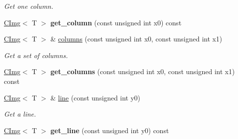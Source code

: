 \begin{DoxyCompactItemize}
\begin{DoxyCompactList}\small\item\em Get one column. \item\end{DoxyCompactList}\item 
\hypertarget{structcimg__library_1_1CImg_ad077e00ce00fcebb299518496bf5bdb5}{
\hyperlink{structcimg__library_1_1CImg}{CImg}$<$ T $>$ {\bfseries get\_\-column} (const unsigned int x0) const }
\label{structcimg__library_1_1CImg_ad077e00ce00fcebb299518496bf5bdb5}

\item 
\hypertarget{structcimg__library_1_1CImg_aa70ff39a9a7bd64954f4f18819f8e596}{
\hyperlink{structcimg__library_1_1CImg}{CImg}$<$ T $>$ \& \hyperlink{structcimg__library_1_1CImg_aa70ff39a9a7bd64954f4f18819f8e596}{columns} (const unsigned int x0, const unsigned int x1)}
\label{structcimg__library_1_1CImg_aa70ff39a9a7bd64954f4f18819f8e596}

\begin{DoxyCompactList}\small\item\em Get a set of columns. \item\end{DoxyCompactList}\item 
\hypertarget{structcimg__library_1_1CImg_a1bc03749880ec2542c303c5c81eea0a2}{
\hyperlink{structcimg__library_1_1CImg}{CImg}$<$ T $>$ {\bfseries get\_\-columns} (const unsigned int x0, const unsigned int x1) const }
\label{structcimg__library_1_1CImg_a1bc03749880ec2542c303c5c81eea0a2}

\item 
\hypertarget{structcimg__library_1_1CImg_ad701e07806866145060dd2cc2805443e}{
\hyperlink{structcimg__library_1_1CImg}{CImg}$<$ T $>$ \& \hyperlink{structcimg__library_1_1CImg_ad701e07806866145060dd2cc2805443e}{line} (const unsigned int y0)}
\label{structcimg__library_1_1CImg_ad701e07806866145060dd2cc2805443e}

\begin{DoxyCompactList}\small\item\em Get a line. \item\end{DoxyCompactList}\item 
\hypertarget{structcimg__library_1_1CImg_abe3a9f5467cf301cb36a6c9ea5202311}{
\hyperlink{structcimg__library_1_1CImg}{CImg}$<$ T $>$ {\bfseries get\_\-line} (const unsigned int y0) const }
\label{structcimg__library_1_1CImg_abe3a9f5467cf301cb36a6c9ea5202311}


\end{DoxyCompactItemize}
